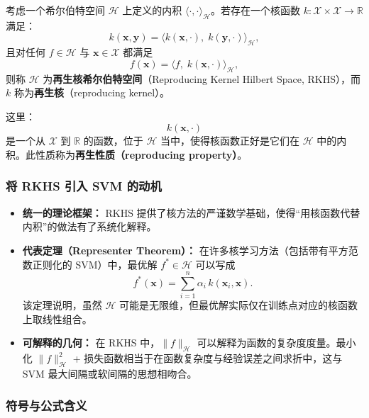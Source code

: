 \documentclass[11pt]{article}
\begin{document}
\begin{CJK}{UTF8}{gbsn}
考虑一个希尔伯特空间 \(\mathcal{H}\) 上定义的内积 \(\langle \cdot,\cdot\rangle_{\mathcal{H}}\)。若存在一个核函数 \(k: \mathcal{X}\times\mathcal{X}\to\mathbb{R}\) 满足：
\[
k(\mathbf{x}, \mathbf{y}) 
= \bigl\langle k(\mathbf{x}, \cdot), \; k(\mathbf{y}, \cdot)\bigr\rangle_{\mathcal{H}},
\]
且对任何 \(f \in \mathcal{H}\) 与 \(\mathbf{x} \in \mathcal{X}\) 都满足
\[
f(\mathbf{x}) 
= \bigl\langle f,\; k(\mathbf{x}, \cdot)\bigr\rangle_{\mathcal{H}},
\]
则称 \(\mathcal{H}\) 为\textbf{再生核希尔伯特空间}（Reproducing Kernel Hilbert Space, RKHS），而 \(k\) 称为\textbf{再生核}（reproducing kernel）。

这里：
\[
k(\mathbf{x}, \cdot)
\]
是一个从 \(\mathcal{X}\) 到 \(\mathbb{R}\) 的函数，位于 \(\mathcal{H}\) 当中，使得核函数正好是它们在 \(\mathcal{H}\) 中的内积。此性质称为\textbf{再生性质（reproducing property）}。

\subsubsection{将 RKHS 引入 SVM 的动机}

\begin{itemize}
    \item \textbf{统一的理论框架：} RKHS 提供了核方法的严谨数学基础，使得“用核函数代替内积”的做法有了系统化解释。
    \item \textbf{代表定理（Representer Theorem）：} 在许多核学习方法（包括带有平方范数正则化的 SVM）中，最优解 \(f^* \in \mathcal{H}\) 可以写成
    \[
    f^*(\mathbf{x}) 
    = \sum_{i=1}^n \alpha_i\, k(\mathbf{x}_i, \mathbf{x}).
    \]
    该定理说明，虽然 \(\mathcal{H}\) 可能是无限维，但最优解实际仅在训练点对应的核函数上取线性组合。
    \item \textbf{可解释的几何：} 在 RKHS 中，\(\|f\|_{\mathcal{H}}\) 可以解释为函数的复杂度度量。最小化 \(\|f\|_{\mathcal{H}}^2\) + 损失函数相当于在函数复杂度与经验误差之间求折中，这与 SVM 最大间隔或软间隔的思想相吻合。
\end{itemize}

\subsubsection{符号与公式含义}


\end{CJK}
\end{document}
